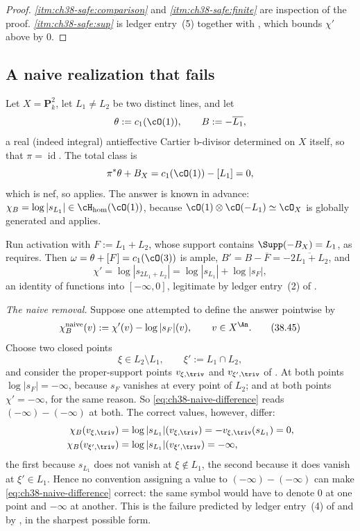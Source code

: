 \begin{proof}
\emph{\cref{itm:ch38-safe:comparison}} and
\emph{\cref{itm:ch38-safe:finite}} are inspection of the proof.
\emph{\cref{itm:ch38-safe:sup}} is ledger entry~(5) together with
, which bounds $\chi'$ above
by $0$.
\end{proof}

\subsection{A naive realization that fails}
\label{sec:ch38-naive}

\begin{example}
\label{ex:ch38-naive-realization-fails}
Let $X=\mathbf P^2_k$, let $L_1\neq L_2$ be two distinct lines, and
let
\[
 \theta:=c_1(\cO(1)),\qquad
 B:=-\overline{L_1},
\]
a real (indeed integral) antieffective Cartier b-divisor determined on
$X$ itself, so that $\pi=\operatorname{id}$.  The total class is
\[
 \pi^*\theta+B_X=c_1(\cO(1))-[L_1]=0,
\]
which is nef, so  applies.  The
answer is known in advance:
$\chi_B=\log|s_{L_1}|\in\cH_{\mathrm{hom}}(\cO(1))$, because
$\cO(1)\otimes\cO(-L_1)\simeq\cO_X$ is globally generated and
 applies.

Run activation with $F:=L_1+L_2$, whose support contains
$\Supp(-B_X)=L_1$, as  requires.
Then $\omega=\theta+[F]=c_1(\cO(3))$ is ample,
$B'=B-\overline F=-\overline{2L_1+L_2}$, and
\[
 \chi'=\log|s_{2L_1+L_2}|=\log|s_{L_1}|+\log|s_F|,
\]
an identity of functions into $[-\infty,0]$, legitimate by
ledger entry~(2) of .

\emph{The naive removal.}  Suppose one attempted to define the answer
pointwise by
\[
 \chi_B^{\mathrm{naive}}(v):=\chi'(v)-\log|s_F|(v),
 \qquad v\in X^{\An}.
\tag{38.45}\label{eq:ch38-naive-difference}
\]
Choose two closed points
\[
 \xi\in L_2\setminus L_1,
 \qquad
 \xi':=L_1\cap L_2,
\]
and consider the proper-support points
$v_{\xi,\triv}$ and $v_{\xi',\triv}$ of
.  At both points
$\log|s_F|=-\infty$, because $s_F$ vanishes at every point of
$L_2$; and at both points $\chi'=-\infty$, for the same reason.  So
\eqref{eq:ch38-naive-difference} reads $(-\infty)-(-\infty)$ at both.
The correct values, however, differ:
\[
 \begin{aligned}
 \chi_B(v_{\xi,\triv})
   &=\log|s_{L_1}|(v_{\xi,\triv})
     =-v_{\xi,\triv}(s_{L_1})=0,\\
 \chi_B(v_{\xi',\triv})
   &=\log|s_{L_1}|(v_{\xi',\triv})=-\infty,
 \end{aligned}
\]
the first because $s_{L_1}$ does not vanish at $\xi\notin L_1$, the
second because it does vanish at $\xi'\in L_1$.  Hence no convention
assigning a value to $(-\infty)-(-\infty)$ can make
\eqref{eq:ch38-naive-difference} correct: the same symbol would have to
denote $0$ at one point and $-\infty$ at another.  This is the failure
predicted by ledger entry~(4) of  and by
, in the sharpest possible form.


\end{example}
